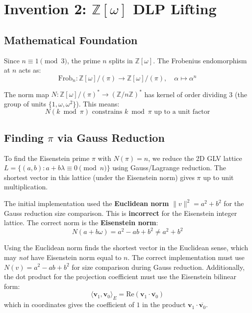 \documentclass[11pt,a4paper]{article}
\theoremstyle{definition}
\newcommand{\Zomega}{\mathbb{Z}[\omega]}
\newcommand{\Zn}{\mathbb{Z}/n\mathbb{Z}}
\begin{document}
\section{Invention 2: $\Zomega$ DLP Lifting}

\subsection{Mathematical Foundation}

Since $n \equiv 1 \pmod{3}$, the prime $n$ splits in $\Zomega$. The Frobenius endomorphism at $n$ acts as:
$$\text{Frob}_n: \Zomega/(\pi) \to \Zomega/(\pi), \quad \alpha \mapsto \alpha^n$$

The norm map $N: \Zomega/(\pi)^* \to (\Zn)^*$ has kernel of order dividing 3 (the group of units $\{1, \omega, \omega^2\}$). This means:
$$N(k \bmod \pi) \text{ constrains } k \bmod \pi \text{ up to a unit factor}$$

\subsection{Finding $\pi$ via Gauss Reduction}

To find the Eisenstein prime $\pi$ with $N(\pi) = n$, we reduce the 2D GLV lattice $L = \{(a, b) : a + b\lambda \equiv 0 \pmod{n}\}$ using Gauss/Lagrange reduction. The shortest vector in this lattice (under the Eisenstein norm) gives $\pi$ up to unit multiplication.

\begin{tcolorbox}[colback=red!5, colframe=red!70!black, title={\textbf{CRITICAL BUG FIX: Eisenstein Norm vs.\ Euclidean Norm}}]
The initial implementation used the \textbf{Euclidean norm} $\|v\|^2 = a^2 + b^2$ for the Gauss reduction size comparison. This is \textbf{incorrect} for the Eisenstein integer lattice. The correct norm is the \textbf{Eisenstein norm}:
$$N(a + b\omega) = a^2 - ab + b^2 \neq a^2 + b^2$$

Using the Euclidean norm finds the shortest vector in the Euclidean sense, which may \emph{not} have Eisenstein norm equal to $n$. The correct implementation must use $N(v) = a^2 - ab + b^2$ for size comparison during Gauss reduction. Additionally, the dot product for the projection coefficient must use the Eisenstein bilinear form:
$$\langle \mathbf{v}_1, \mathbf{v}_0 \rangle_E = \text{Re}(\mathbf{v}_1 \cdot \overline{\mathbf{v}_0})$$
which in coordinates gives the coefficient of $1$ in the product $\mathbf{v}_1 \cdot \overline{\mathbf{v}_0}$.
\end{tcolorbox}
\end{document}
